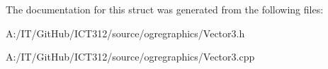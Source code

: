 The documentation for this struct was generated from the following files\-:\begin{DoxyCompactItemize}
\item 
A\-:/\-I\-T/\-Git\-Hub/\-I\-C\-T312/source/ogregraphics/Vector3.\-h\item 
A\-:/\-I\-T/\-Git\-Hub/\-I\-C\-T312/source/ogregraphics/Vector3.\-cpp\end{DoxyCompactItemize}
